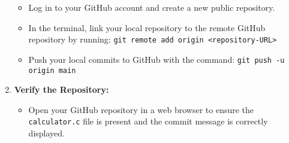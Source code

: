 \documentclass[a4paper,12pt]{article}
\begin{document}
\begin{enumerate}[label=\arabic*.]
\begin{itemize}
        \item Log in to your GitHub account and create a new public repository.
        \item In the terminal, link your local repository to the remote GitHub repository by running: \texttt{git remote add origin <repository-URL>}
        \item Push your local commits to GitHub with the command: \texttt{git push -u origin main}
    \end{itemize}
    \item \textbf{Verify the Repository:}
    \begin{itemize}
        \item Open your GitHub repository in a web browser to ensure the \texttt{calculator.c} file is present and the commit message is correctly displayed.
    \end{itemize}
\end{enumerate}
\end{document}
